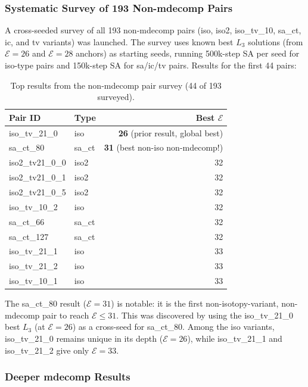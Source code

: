 \documentclass[11pt,a4paper]{article}
\theoremstyle{remark}
\newcommand{\E}{\mathcal{E}}
\begin{document}
\subsubsection{Systematic Survey of 193 Non-mdecomp Pairs}

A cross-seeded survey of all 193 non-mdecomp pairs (iso, iso2, iso\_tv\_10, sa\_ct,
ic, and tv variants) was launched. The survey uses known best $L_3$ solutions
(from $\E=26$ and $\E=28$ anchors) as starting seeds, running 500k-step SA per seed for
iso-type pairs and 150k-step SA for sa/ic/tv pairs. Results for the first 44 pairs:

\begin{table}[h]
\centering
\caption{Top results from the non-mdecomp pair survey (44 of 193 surveyed).}\label{tab:nonmdecomp}
\begin{tabular}{llr}
\toprule
Pair ID & Type & Best $\E$\\
\midrule
iso\_tv\_21\_0  & iso   & \textbf{26} (prior result, global best)\\
sa\_ct\_80      & sa\_ct & \textbf{31} (best non-iso non-mdecomp!)\\
iso2\_tv21\_0\_0 & iso2 & 32\\
iso2\_tv21\_0\_1 & iso2 & 32\\
iso2\_tv21\_0\_5 & iso2 & 32\\
iso\_tv\_10\_2   & iso  & 32\\
sa\_ct\_66      & sa\_ct & 32\\
sa\_ct\_127     & sa\_ct & 32\\
iso\_tv\_21\_1   & iso  & 33\\
iso\_tv\_21\_2   & iso  & 33\\
iso\_tv\_10\_1   & iso  & 33\\
\bottomrule
\end{tabular}
\end{table}

The sa\_ct\_80 result ($\E=31$) is notable: it is the first non-isotopy-variant,
non-mdecomp pair to reach $\E \leq 31$. This was discovered by using the
iso\_tv\_21\_0 best $L_3$ (at $\E=26$) as a cross-seed for sa\_ct\_80. Among the iso
variants, iso\_tv\_21\_0 remains unique in its depth ($\E=26$), while iso\_tv\_21\_1 and
iso\_tv\_21\_2 give only $\E=33$.

\subsubsection{Deeper mdecomp Results}
\end{document}
